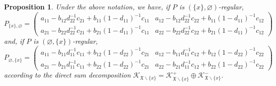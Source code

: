 \documentclass[11pt]{article}
\numberwithin{equation}{section}
\numberwithin{equation}{section}
\newtheorem{Proposition}[Theorem]{Proposition}
 { \theoremstyle{definition}
\newtheorem{Definition}[Theorem]{Definition}
\newtheorem{Example}[Theorem]{Example}
\newtheorem{Remark}[Theorem]{Remark} }
\newcommand{\mfrak}[1]{\mathfrak{#1}}
\newcommand{\mcal}[1]{\mathcal{#1}}
\begin{document}
\begin{Proposition}\label{prop:expression_cond_proj}
Under the above notation, we have, if $P$ is $(\{x\},\varnothing)$-regular,
\begin{equation*}
	P_{\{x\},\varnothing}=\left(
	\begin{matrix}
		a_{11}-b_{12}d_{22}^{-1}c_{21}+b_{11}(1-d_{11})^{-1}c_{11} & a_{12}-b_{12}d_{22}^{-1}c_{22}+b_{11}(1-d_{11})^{-1}c_{12}\\
		a_{21}-b_{22}d_{22}^{-1}c_{21}+b_{21}(1-d_{11})^{-1}c_{11} & a_{22}-b_{22}d_{22}^{-1}c_{22}+b_{21}(1-d_{11})^{-1}c_{12}
	\end{matrix}
	\right)
\end{equation*}
and, if $P$ is $(\varnothing,\{x\})$-regular,
\begin{equation*}
	P_{\varnothing,\{x\}}=\left(
	\begin{matrix}
		a_{11}-b_{11}d_{11}^{-1}c_{11}+b_{12}(1-d_{22})^{-1}c_{21} & a_{12}-b_{11}d_{11}^{-1}c_{12}+b_{12}(1-d_{22})^{-1}c_{22}\\
		a_{21}-b_{21}d_{11}^{-1}c_{11}+b_{22}(1-d_{22})^{-1}c_{21} & a_{22}-b_{21}d_{11}^{-1}c_{12}+b_{22}(1-d_{22})^{-1}c_{22}
	\end{matrix}
	\right)
\end{equation*}
according to the direct sum decomposition $\mcal{K}_{\mfrak{X}\backslash\{x\}}=\mcal{K}^{+}_{\mfrak{X}\backslash\{x\}}\oplus \mcal{K}^{-}_{\mfrak{X}\backslash\{x\}}$.
\end{Proposition}
\end{document}

